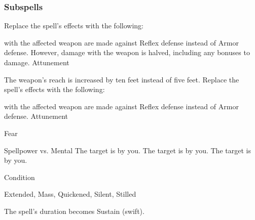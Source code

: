 \subsubsection{Subspells}
Replace the spell's effects with the following:
\begin{spellcontent}
\begin{augmenteffects}
\spelleffect
{} with the affected weapon are made against Reflex defense instead of Armor defense.
However, damage with the weapon is halved, including any bonuses to damage.
\spelldur Attunement
\end{augmenteffects}
\end{spellcontent}
The weapon's reach is increased by ten feet instead of five feet.
Replace the spell's effects with the following:
\begin{spellcontent}
\begin{augmenteffects}
\spelleffect
{} with the affected weapon are made against Reflex defense instead of Armor defense.
\spelldur Attunement
\end{augmenteffects}
\end{spellcontent}
\begin{spellsection}{Fear}
\begin{spellheader}
\end{spellheader}
\begin{spellcontent}
\begin{spelltargetinginfo}
\end{spelltargetinginfo}
\begin{spelleffects}
\begin{spellattack}{Spellpower vs. Mental}
\spellsuccess The target is \frightened by you.
\spellcritical The target is \panicked by you.
\spellfailure The target is \shaken by you.
\end{spellattack}
\spelldur Condition
\end{spelleffects}
\end{spellcontent}
\begin{spellfooter}
 Extended, Mass, Quickened, Silent, Stilled
\end{spellfooter}
\begin{spellsubcontent}
\begin{spellcantrip}
The spell's duration becomes Sustain (swift).
\end{spellcantrip}
\end{spellsubcontent}
\end{spellsection}
